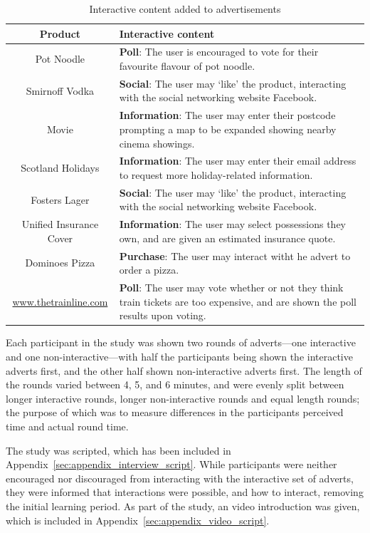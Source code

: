 	\begin{table}[hb]
		\centering
		\begin{tabularx}{\linewidth}{ c X }
			\toprule
			\bf Product & \bf Interactive content \\
			\midrule
			Pot Noodle & \textbf{Poll}: The user is encouraged to vote for their favourite flavour of pot noodle. \\
			Smirnoff Vodka & \textbf{Social}: The user may `like' the product, interacting with the social networking website Facebook. \\ %
			Movie & \textbf{Information}: The user may enter their postcode prompting a map to be expanded showing nearby cinema showings. \\
			Scotland Holidays & \textbf{Information}: The user may enter their email address to request more holiday-related information. \\
			Fosters Lager & \textbf{Social}: The user may `like' the product, interacting with the social networking website Facebook. \\
			Unified Insurance Cover & \textbf{Information}: The user may select possessions they own, and are given an estimated insurance quote. \\
			Dominoes Pizza & \textbf{Purchase}: The user may interact witht he advert to order a pizza. \\
			\url{www.thetrainline.com} & \textbf{Poll}: The user may vote whether or not they think train tickets are too expensive, and are shown the poll results upon voting. \\
			\bottomrule
		\end{tabularx}
		\caption{Interactive content added to advertisements}
		\label{tab:interactive_content}
	\end{table}

	Each participant in the study was shown two rounds of adverts---one interactive and one non-interactive---with half the participants being shown the interactive adverts first, and the other half shown non-interactive adverts first. The length of the rounds varied between 4, 5, and 6 minutes, and were evenly split between longer interactive rounds, longer non-interactive rounds and equal length rounds; the purpose of which was to measure differences in the participants perceived time and actual round time. 

	The study was scripted, which has been included in Appendix~\ref{sec:appendix_interview_script}. While participants were neither encouraged nor discouraged from interacting with the interactive set of adverts, they were informed that interactions were possible, and how to interact, removing the initial learning period. As part of the study, an video introduction was given, which is included in Appendix~\ref{sec:appendix_video_script}.


